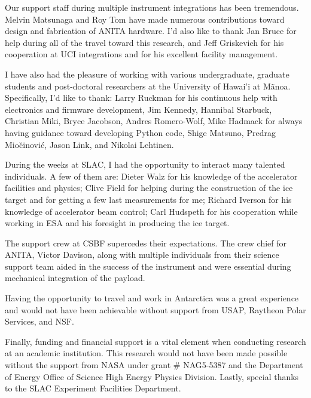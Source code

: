\begin{acknowledgements}
\par Our support staff during multiple instrument integrations has been tremendous.  Melvin Matsunaga and Roy Tom have made numerous contributions toward design and fabrication of ANITA hardware. I'd also like to thank Jan Bruce for help during all of the travel toward this research, and Jeff Griskevich for his cooperation at UCI integrations and for his excellent facility management.

\par I have also had the pleasure of working with various undergraduate, graduate students and post-doctoral researchers at the University of Hawai'i at M\~{a}noa.  Specifically, I'd like to thank: Larry Ruckman for his continuous help with electronics and firmware development, Jim Kennedy, Hannibal Starbuck, Christian Miki, Bryce Jacobson, Andres Romero-Wolf, Mike Hadmack for always having guidance toward developing Python code, Shige Matsuno, Predrag Mio\u{c}inovi\'{c}, Jason Link, and Nikolai Lehtinen.

\par During the weeks at SLAC, I had the opportunity to interact many talented individuals.  A few of them are: Dieter Walz for his knowledge of the accelerator facilities and physics; Clive Field for helping during the construction of the ice target and for getting a few last measurements for me; Richard Iverson for his knowledge of accelerator beam control; Carl Hudspeth for his cooperation while working in ESA and his foresight in producing the ice target.

\par The support crew at CSBF supercedes their expectations.  The crew chief for ANITA, Victor Davison, along with multiple individuals from their science support team aided in the success of the instrument and were essential during mechanical integration of the payload.

\par Having the opportunity to travel and work in Antarctica was a great experience and would not have been achievable without support from USAP, Raytheon Polar Services, and NSF.

\par Finally, funding and financial support is a vital element when conducting research at an academic institution.  This research would not have been made possible without the support from NASA under grant \# NAG5-5387 and the Department of Energy Office of Science High Energy Physics Division.  Lastly, special thanks to the SLAC Experiment Facilities Department.
\end{acknowledgements}

